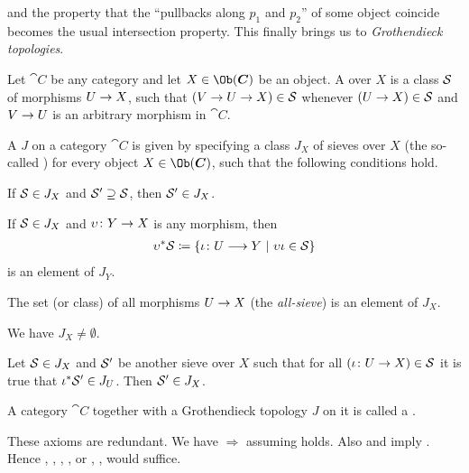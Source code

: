 \documentclass[a4paper,parskip=half,numbers=enddot, DIV=12]{scrreprt}
\begin{document}
and the property that the ``pullbacks along $ p_1$ and $ p_2$'' of some object coincide becomes the usual intersection property. This finally brings us to \emph{Grothendieck topologies}.
\begin{defi}
	Let $\cat C$ be any category and let $X\in\Ob(\cat C)$ be an object. A  over $X$ is a class $\mathcal{S}$ of morphisms $U\morphism X$, such that $(V\morphism U\morphism X)\in \Ss$ whenever $(U\morphism X)\in \Ss$ and $V\morphism U$ is an arbitrary morphism in $\cat C$.
\end{defi}
\begin{defi}
	A  $J$ on a category $\cat C$ is given by specifying a class $J_X$ of sieves over $X$ (the so-called ) for every object $X\in\Ob(\cat C)$, such that the following conditions hold.
	\begin{alphanumerate}
		\item If $\mathcal{S}\in J_X$ and $\mathcal{S}'\supseteq \mathcal{S}$, then $\mathcal{S}'\in J_X$.
		\item If $\mathcal{S}\in J_X$ and $\upsilon\colon Y\morphism X$ is any morphism, then
		\begin{align*}
			\upsilon^*\Ss\coloneqq\left\{\iota\colon U\morphism Y\st \upsilon\iota\in\Ss\right\}
		\end{align*}
		is an element of $ J_Y$.
		\item The set (or class) of all morphisms $U\morphism X$ (the \emph{all-sieve}) is an element of $ J_X$.
		\item[\itememph{c'}] We have $ J_X\neq\emptyset$.
		\item Let $\mathcal{S}\in J_X$ and $\mathcal{S}'$ be another sieve over $X$ such that for all $(\iota\colon U\morphism X)\in\Ss$ it is true that $\iota^*\mathcal{S}'\in J_U$. Then $\mathcal{S}'\in J_X$.
	\end{alphanumerate}
	A category $\cat C$ together with a Grothendieck topology $J$ on it is called a .
\end{defi}
\begin{rem}
	These axioms are redundant. We have  $\Rightarrow$  assuming  holds. Also  and  imply . Hence , , , , or , ,  would suffice.
\end{rem}
\end{document}
